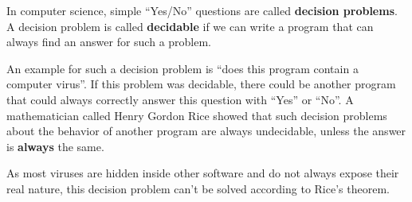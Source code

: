 
In computer science, simple ``Yes/No'' questions are called \textbf{decision
problems}. A decision problem is called \textbf{decidable} if we can
write a program that can always find an answer for such a problem.

An example for such a decision problem is ``does this program contain a
computer virus''. If this problem was decidable, there could be
another program that could always correctly answer this question with
``Yes'' or ``No''. A mathematician called Henry Gordon Rice showed that
such decision problems about the behavior of another program are
always undecidable, unless the answer is \textbf{always} the same.

As most viruses are hidden inside other software and do not always
expose their real nature, this decision problem can't be solved
according to Rice's theorem.

